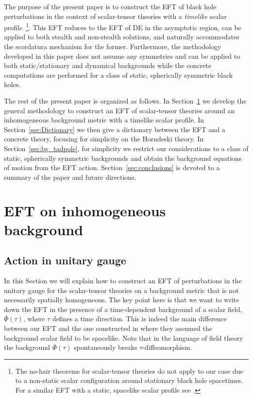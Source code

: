 \documentclass[a4paper,11pt]{article}
\numberwithin{equation}{section}
\begin{document}
The purpose of the present paper is to construct the EFT of black hole perturbations in the context of scalar-tensor theories with a \textit{timelike} scalar profile~\footnote{The no-hair theorems for scalar-tensor theories \cite{Hui:2012qt,Saravani:2019xwx,Babichev:2016rlq,Antoniou:2017acq,Babichev:2013cya} do not apply to our case due to a non-static scalar configuration around stationary black hole spacetimes. For a similar EFT with a static, spacelike scalar profile see \cite{Franciolini:2018uyq}.}. This EFT reduces to the EFT of DE in the asymptotic region, can be applied to both stealth and non-stealth solutions, and naturally accommodates the scordatura mechanism for the former. Furthermore, the methodology developed in this paper does not assume any symmetries and can be applied to both static/stationary and dynamical backgrounds while the concrete computations are performed for a class of static, spherically symmetric black holes. 

The rest of the present paper is organized as follows. In Section~\ref{sec2:EFT_inhomo} we develop the general methodology to construct an EFT of scalar-tensor theories around an inhomogeneous background metric with a timelike scalar profile. In Section~\ref{sec:Dictionary} we then give a dictionary between the EFT and a concrete theory, focusing for simplicity on the Horndeski theory. In Section~\ref{sec:bg_tadpole}, for simplicity we restrict our considerations to a class of static, spherically symmetric backgrounds and obtain the background equations of motion from the EFT action. Section~\ref{sec:conclusions} is devoted to a summary of the paper and future directions. 



\section{EFT on inhomogeneous background}\label{sec2:EFT_inhomo}
\subsection{Action in unitary gauge}
In this Section we will explain how to construct an EFT of perturbations in the unitary gauge for the scalar-tensor theories on a background metric that is not necessarily spatially homogeneous. The key point here is that we want to write down the EFT in the presence of a time-dependent background of a scalar field, $\bar{\Phi}(\tau)$, where $\tau$ defines a time direction. This is indeed the main difference between our EFT and the one constructed in \cite{Franciolini:2018uyq} where they assumed the background scalar field to be spacelike. Note that in the language of field theory the background $\bar{\Phi}(\tau)$ spontaneously breaks $\tau$-diffeomorphism. 
\end{document}
